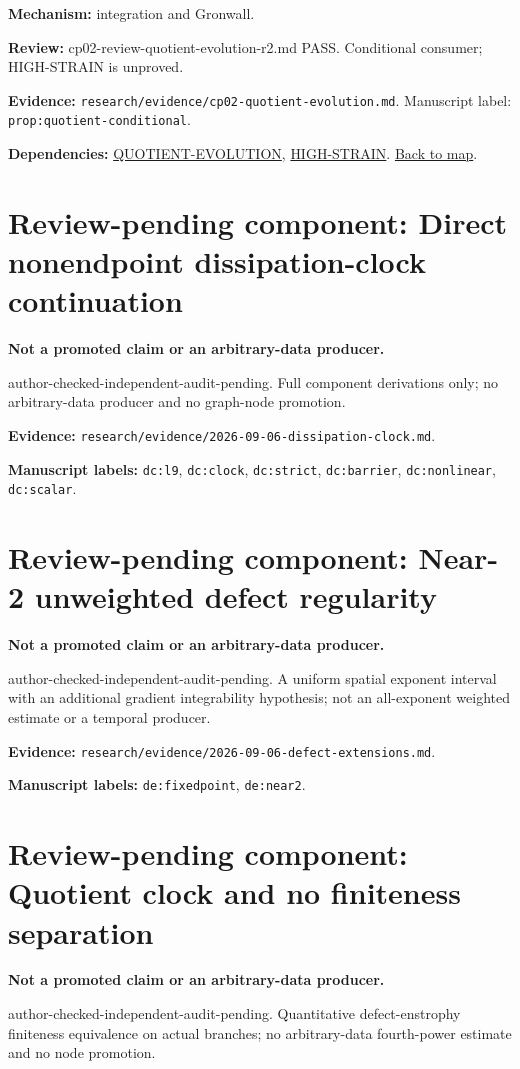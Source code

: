 \documentclass[10pt]{article}
\begin{document}
\textbf{Mechanism:} integration and Gronwall.

\textbf{Review:} cp02-review-quotient-evolution-r2.md PASS. Conditional consumer; HIGH-STRAIN is unproved.

\textbf{Evidence:} \texttt{research/evidence/cp02-quotient-evolution.md}. Manuscript label: \texttt{prop:quotient-conditional}.

\textbf{Dependencies:} \hyperref[node:QUOTIENT-EVOLUTION]{QUOTIENT-EVOLUTION}, \hyperref[node:HIGH-STRAIN]{HIGH-STRAIN}. \hyperref[map]{Back to map}.

\clearpage\section*{Review-pending component: Direct nonendpoint dissipation-clock continuation}
\textbf{Not a promoted claim or an arbitrary-data producer.}

author-checked-independent-audit-pending. Full component derivations only; no arbitrary-data producer and no graph-node promotion.

\textbf{Evidence:} \texttt{research/evidence/2026-09-06-dissipation-clock.md}.

\textbf{Manuscript labels:} \texttt{dc:l9}, \texttt{dc:clock}, \texttt{dc:strict}, \texttt{dc:barrier}, \texttt{dc:nonlinear}, \texttt{dc:scalar}.
\clearpage\section*{Review-pending component: Near-2 unweighted defect regularity}
\textbf{Not a promoted claim or an arbitrary-data producer.}

author-checked-independent-audit-pending. A uniform spatial exponent interval with an additional gradient integrability hypothesis; not an all-exponent weighted estimate or a temporal producer.

\textbf{Evidence:} \texttt{research/evidence/2026-09-06-defect-extensions.md}.

\textbf{Manuscript labels:} \texttt{de:fixedpoint}, \texttt{de:near2}.
\clearpage\section*{Review-pending component: Quotient clock and no finiteness separation}
\textbf{Not a promoted claim or an arbitrary-data producer.}

author-checked-independent-audit-pending. Quantitative defect-enstrophy finiteness equivalence on actual branches; no arbitrary-data fourth-power estimate and no node promotion.
\end{document}
